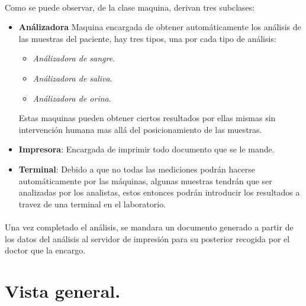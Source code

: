 \documentclass[a4paper,10pt]{article}
\begin{document}
\paragraph{}
Como se puede observar, de la clase maquina, derivan tres subclases:
\begin{itemize}
	\item {\bf Análizadora} Maquina encargada de obtener automáticamente los análisis de las muestras del paciente, hay tres tipos, una por cada tipo de análisis:
	\begin{itemize}
		\item {\it Análizadora de sangre}.
		\item {\it Análizadora de saliva}.
		\item {\it Análizadora de orina}.
	\end{itemize}
	Estas maquinas pueden obtener ciertos resultados por ellas mismas sin intervención humana mas allá del posicionamiento de las muestras.
	\item {\bf Impresora}: Encargada de imprimir todo documento que se le mande.
	\item {\bf Terminal}: Debido a que no todas las mediciones podrán hacerse automáticamente por las máquinas, algunas muestras tendrán que ser analizadas por los analistas, estos entonces podrán introducir los resultados a travez de una terminal en el laboratorio.
\end{itemize}
\paragraph{}
Una vez completado el análisis, se mandara un documento generado a partir de los datos del análisis al servidor de impresión para su posterior recogida por el doctor que la encargo.\\
\pagebreak
\section{Vista general.}
\end{document}
